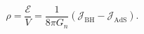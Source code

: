 \begin{equation}
\rho=\frac{\mathcal{E}}{V}=\frac{1}{8\pi G_n}
  (\mathcal{J}_\textrm{BH}-\mathcal{J}_\textrm{AdS}).
\end{equation}

